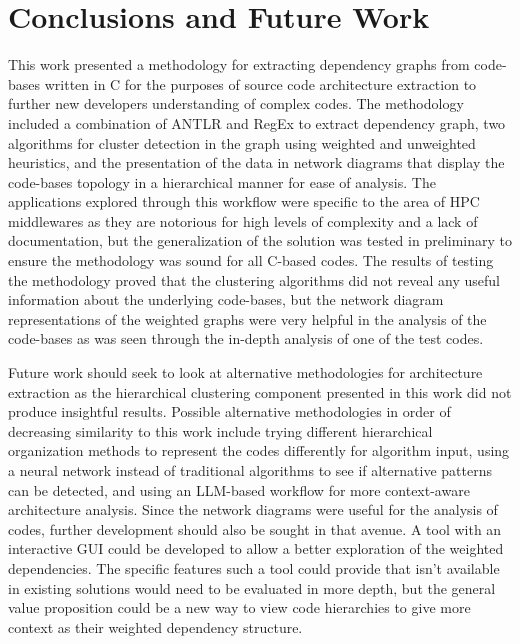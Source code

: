 \section{Conclusions and Future Work}
\label{sec:conclusions}

This work presented a methodology for extracting dependency graphs from code-bases written in C for the purposes of source code architecture extraction to further new developers understanding of complex codes. The methodology included a combination of ANTLR and RegEx to extract dependency graph, two algorithms for cluster detection in the graph using weighted and unweighted heuristics, and the presentation of the data in network diagrams that display the code-bases topology in a hierarchical manner for ease of analysis. The applications explored through this workflow were specific to the area of HPC middlewares as they are notorious for high levels of complexity and a lack of documentation, but the generalization of the solution was tested in preliminary to ensure the methodology was sound for all C-based codes. The results of testing the methodology proved that the clustering algorithms did not reveal any useful information about the underlying code-bases, but the network diagram representations of the weighted graphs were very helpful in the analysis of the code-bases as was seen through the in-depth analysis of one of the test codes.

Future work should seek to look at alternative methodologies for architecture extraction as the hierarchical clustering component presented in this work did not produce insightful results. Possible alternative methodologies in order of decreasing similarity to this work include trying different hierarchical organization methods to represent the codes differently for algorithm input, using a neural network instead of traditional algorithms to see if alternative patterns can be detected, and using an LLM-based workflow for more context-aware architecture analysis. Since the network diagrams were useful for the analysis of codes, further development should also be sought in that avenue. A tool with an interactive GUI could be developed to allow a better exploration of the weighted dependencies. The specific features such a tool could provide that isn't available in existing solutions would need to be evaluated in more depth, but the general value proposition could be a new way to view code hierarchies to give more context as their weighted dependency structure.


